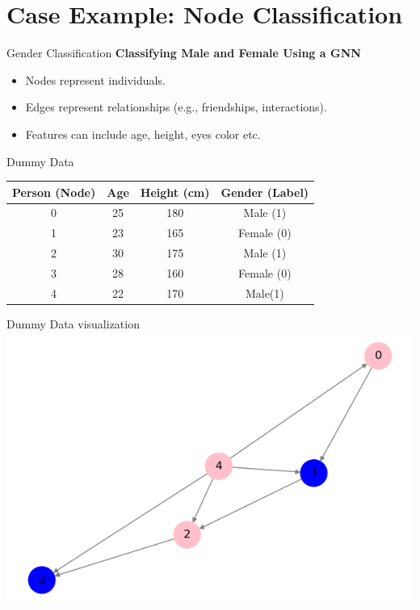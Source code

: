 \documentclass{beamer}
\begin{document}
\section{Case Example: Node Classification}
\begin{frame}{Gender Classification}
\textbf{Classifying Male and Female Using a GNN}
	\begin{itemize}
        		\item Nodes represent individuals.
       		\item Edges represent relationships (e.g., friendships, interactions).
     		\item Features can include age, height, eyes color etc.
   	\end{itemize}
\end{frame}
\begin{frame}{Dummy Data}
    \centering
    \renewcommand{\arraystretch}{1.2}
    \begin{tabular}{cccc}  %
        \toprule
        \textbf{Person (Node)} & \textbf{Age} & \textbf{Height (cm)} & \textbf{Gender (Label)} \\
        \midrule
        0 & 25 & 180 & Male (1) \\
        1 & 23 & 165 & Female (0) \\
        2 & 30 & 175 & Male (1) \\
        3 & 28 & 160 & Female (0) \\
        4 & 22 & 170 & Male(1) \\
        \bottomrule
    \end{tabular}
\end{frame}


\begin{frame}{Dummy Data visualization}
\includegraphics[width=0.8\linewidth]{gender.png}
\end{frame}
\end{document}
